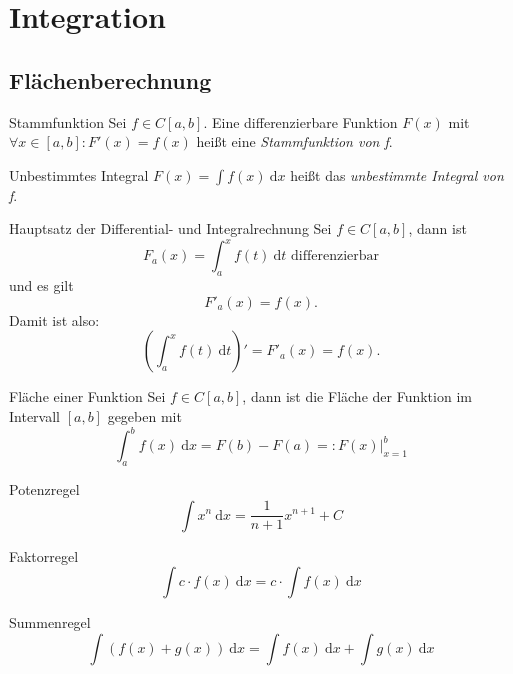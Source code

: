 \documentclass[german]{../spicker}
\newcommand{\dx}{~\mathrm{d}x}
\newcommand{\dt}{~\mathrm{d}t}
\begin{document}
\newpage
\section{Integration}
\subsection{Flächenberechnung}

\begin{defi}{Stammfunktion}
    Sei $f\in C[a, b]$. Eine differenzierbare Funktion $F(x)$ mit $\forall x\in [a, b] : F'(x) = f(x)$ heißt eine \emph{Stammfunktion von f}.
\end{defi}

\begin{defi}{Unbestimmtes Integral}
    $F(x) = \int f(x) \dx$ heißt das \emph{unbestimmte Integral von f}.
\end{defi}

\begin{defi}{Hauptsatz der Differential- und Integralrechnung}
    Sei $f\in C[a, b]$, dann ist
    $$
        F_a(x) = \int^x_a f(t)\dt \text{ differenzierbar}
    $$
    und es gilt
    $$
        F'_a(x) = f(x).
    $$
    Damit ist also:
    $$
        \left(\int^x_a f(t)\dt\right)' = F'_a(x) = f(x).
    $$
\end{defi}

\begin{defi}{Fläche einer Funktion}
    Sei $f \in C[a, b]$, dann ist die Fläche der Funktion im Intervall $[a, b]$ gegeben mit
    $$
        \int_a^b f(x) \dx = F(b) - F(a) =: \left.F(x)\right|^b_{x=1}
    $$
\end{defi}

\begin{bonus}{Potenzregel}
    $$
        \int x^n \dx = \frac{1}{n+1}x^{n+1} + C
    $$
\end{bonus}

\begin{bonus}{Faktorregel}
    $$
        \int c\cdot f(x) \dx = c\cdot \int f(x) \dx
    $$
\end{bonus}

\begin{bonus}{Summenregel}
    $$
        \int (f(x) + g(x))\dx = \int f(x) \dx + \int g(x) \dx
    $$
\end{bonus}
\end{document}
